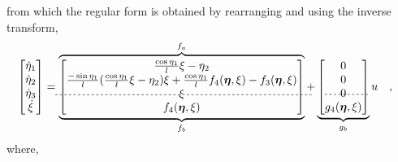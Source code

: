 %
from which the regular form is obtained by rearranging and using the inverse transform,
\begin{align}
\begin{bmatrix}
  \dot{\eta}_1   \\
  \dot{\eta}_2   \\
  \dot{\eta}_3   \\  %
  \dot{\xi}
  \end{bmatrix} 
  &=
  \overbrace{
    \underbrace{
      \begin{bmatrix}
      \frac{\cos \eta_1}{l} \xi - \eta_2    \\
      \frac{-\sin \eta_1}{l} (\frac{\cos \eta_1}{l} \xi - \eta_2) \xi + \frac{\cos \eta_1}{l} f_4(\vec{\eta},\xi) - f_3(\vec{\eta},\xi) \\
      \xi    \\ %
      \begin{picture} (0,0)(0,0) \multiput(-95,14)(4,0){57}{\line(2,0){2}} \end{picture}
      f_4(\vec{\eta},\xi) 
      \end{bmatrix}
    }_{f_b} }^{f_a}
  +
  \underbrace{
    \begin{bmatrix}
    0    \\
    0    \\
    0    \\  %
    \begin{picture} (0,0)(0,0) \multiput(0,14)(4,0){10}{\line(2,0){2}} \end{picture}
    g_4(\vec{\eta},\xi)
    \end{bmatrix}
  }_{g_b} u  \ \ \ ,
  \label{eq:regularFormMatrix}
\end{align}
where,
\begingroup\makeatletter\def\f@size{10}\check@mathfonts
\def\maketag@@@#1{\hbox{\m@th\normalsize\normalfont#1}}%
